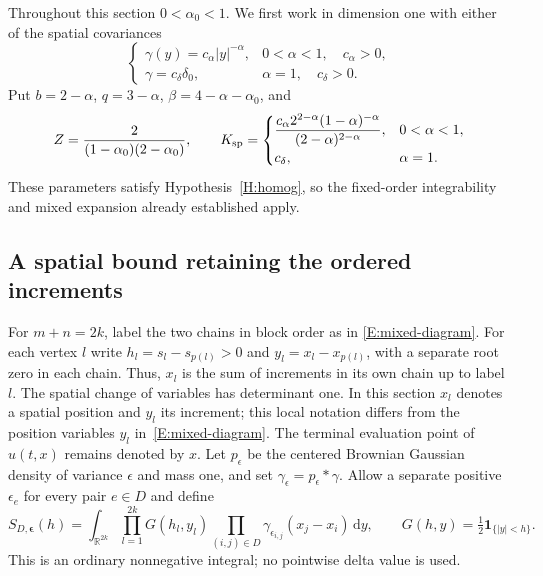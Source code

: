\documentclass[12pt]{article}
\numberwithin{equation}{section}
\theoremstyle{definition}
\newcommand{\R}{\mathbb{R}}
\newcommand{\ud}{\,\mathrm{d}}
\begin{document}
Throughout this section $0<\alpha_0<1$. We first work in dimension one
with either of the spatial covariances
\begin{equation}\label{E:d1-covariances}
  \begin{cases}
    \gamma(y)=c_\alpha|y|^{-\alpha},&0<\alpha<1,\quad c_\alpha>0,\\
    \gamma=c_\delta\delta_0,&\alpha=1,\quad c_\delta>0.
  \end{cases}
\end{equation}
Put $b=2-\alpha$, $q=3-\alpha$, $\beta=4-\alpha-\alpha_0$, and
\begin{equation}\label{E:d1-constants}
  Z=\frac{2}{(1-\alpha_0)(2-\alpha_0)},\qquad
  K_{\rm sp}=
  \begin{cases}
    \displaystyle\frac{c_\alpha 2^{2-\alpha}(1-\alpha)^{-\alpha}}
    {(2-\alpha)^{2-\alpha}},&0<\alpha<1,\\[2mm]
    c_\delta,&\alpha=1.
  \end{cases}
\end{equation}
These parameters satisfy Hypothesis~\ref{H:homog}, so the fixed-order
integrability and mixed expansion already established apply.

\subsection{A spatial bound retaining the ordered increments}

For $m+n=2k$, label the two chains in block order as in
\eqref{E:mixed-diagram}. For each vertex $l$ write
$h_l=s_l-s_{p(l)}>0$ and $y_l=x_l-x_{p(l)}$, with a separate root zero
in each chain. Thus, $x_l$ is the sum of increments in its own chain
up to label $l$. The spatial change of variables has determinant one.
In this section $x_l$ denotes a spatial position and $y_l$ its increment; this local
notation differs from the position variables $y_l$
in~\eqref{E:mixed-diagram}. The terminal evaluation point of $u(t,x)$
remains denoted by $x$.
Let $p_\epsilon$ be the centered Brownian Gaussian density of variance
$\epsilon$ and mass one, and set
$\gamma_\epsilon=p_\epsilon*\gamma$. Allow a separate positive
$\epsilon_e$ for every pair $e\in D$ and define
\[
  S_{D,\boldsymbol\epsilon}(h)
  =\int_{\R^{2k}}\prod_{l=1}^{2k}G(h_l,y_l)
  \prod_{(i,j)\in D}\gamma_{\epsilon_{i,j}}(x_j-x_i)\ud y,
  \qquad G(h,y)=\tfrac12\mathbf1_{\{|y|<h\}}.
\]
This is an ordinary nonnegative integral; no pointwise delta value is
used.
\end{document}
